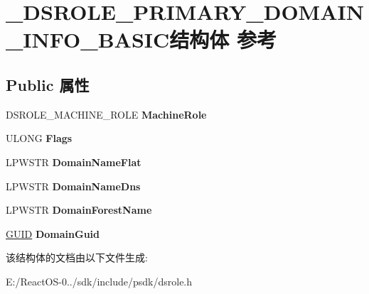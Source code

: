 \hypertarget{struct___d_s_r_o_l_e___p_r_i_m_a_r_y___d_o_m_a_i_n___i_n_f_o___b_a_s_i_c}{}\section{\+\_\+\+D\+S\+R\+O\+L\+E\+\_\+\+P\+R\+I\+M\+A\+R\+Y\+\_\+\+D\+O\+M\+A\+I\+N\+\_\+\+I\+N\+F\+O\+\_\+\+B\+A\+S\+I\+C结构体 参考}
\label{struct___d_s_r_o_l_e___p_r_i_m_a_r_y___d_o_m_a_i_n___i_n_f_o___b_a_s_i_c}
\subsection*{Public 属性}
\begin{DoxyCompactItemize}
\item 
\mbox{\label{struct___d_s_r_o_l_e___p_r_i_m_a_r_y___d_o_m_a_i_n___i_n_f_o___b_a_s_i_c_aa81fe8fbb48c36d3b8b999220dcd12da}} 
D\+S\+R\+O\+L\+E\+\_\+\+M\+A\+C\+H\+I\+N\+E\+\_\+\+R\+O\+LE {\bfseries Machine\+Role}
\item 
\mbox{\label{struct___d_s_r_o_l_e___p_r_i_m_a_r_y___d_o_m_a_i_n___i_n_f_o___b_a_s_i_c_ae76ec8b656a93a855aebbc972b7eebe0}} 
U\+L\+O\+NG {\bfseries Flags}
\item 
\mbox{\label{struct___d_s_r_o_l_e___p_r_i_m_a_r_y___d_o_m_a_i_n___i_n_f_o___b_a_s_i_c_adfedcc5cf0fa25d785fd7505e5aed079}} 
L\+P\+W\+S\+TR {\bfseries Domain\+Name\+Flat}
\item 
\mbox{\label{struct___d_s_r_o_l_e___p_r_i_m_a_r_y___d_o_m_a_i_n___i_n_f_o___b_a_s_i_c_a7ec82184662b833f75cfc4592567538b}} 
L\+P\+W\+S\+TR {\bfseries Domain\+Name\+Dns}
\item 
\mbox{\label{struct___d_s_r_o_l_e___p_r_i_m_a_r_y___d_o_m_a_i_n___i_n_f_o___b_a_s_i_c_a9bf8250c6d871479f9d294d11f033963}} 
L\+P\+W\+S\+TR {\bfseries Domain\+Forest\+Name}
\item 
\mbox{\label{struct___d_s_r_o_l_e___p_r_i_m_a_r_y___d_o_m_a_i_n___i_n_f_o___b_a_s_i_c_af600bd04599add07554d7faba6593094}} 
\hyperlink{interface_g_u_i_d}{G\+U\+ID} {\bfseries Domain\+Guid}
\end{DoxyCompactItemize}


该结构体的文档由以下文件生成\+:\begin{DoxyCompactItemize}
\item 
E\+:/\+React\+O\+S-\/0../sdk/include/psdk/dsrole.\+h\end{DoxyCompactItemize}
